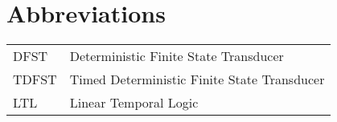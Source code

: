 
\cleardoublepage
{}
{}
\chapter*{Abbreviations}
\label{section-abbrevs}

\begin{tabularx}{\textwidth}{lX}
  DFST & Deterministic Finite State Transducer\\
  TDFST & Timed Deterministic Finite State Transducer\\
  LTL & Linear Temporal Logic\\

\end{tabularx}

